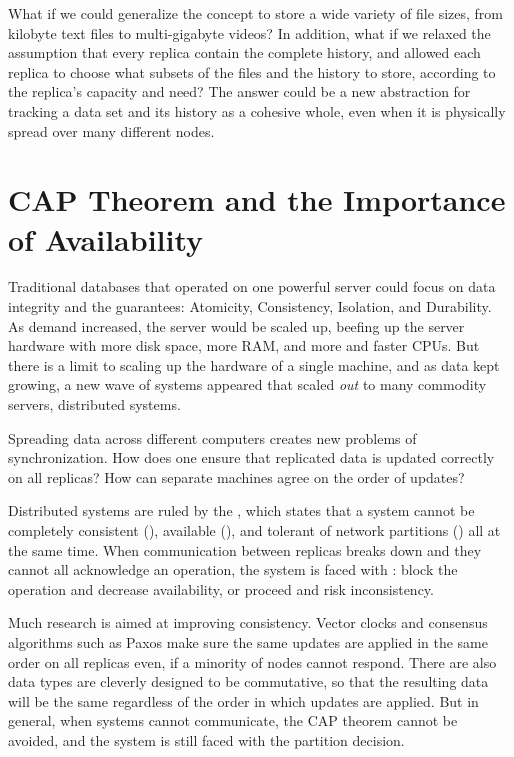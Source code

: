What if we could generalize the 
concept to store a wide variety of file sizes, from kilobyte text files to
multi-gigabyte videos? In addition, what if we relaxed the assumption that every
replica contain the complete history, and allowed each replica to choose what
subsets of the files and the history to store, according to the replica's
capacity and need? The answer could be a new abstraction for tracking a data set
and its history as a cohesive whole, even when it is physically spread over many
different nodes.

%



\section{CAP Theorem and the Importance of Availability}

Traditional databases that operated on one powerful server could focus on data
integrity and the  guarantees: Atomicity, Consistency, Isolation,
and Durability. As demand increased, the
server would be scaled up, beefing up the server hardware with more disk space,
more RAM, and more and faster CPUs. But there is a limit to scaling up the
hardware of a single machine, and as data kept growing, a new wave of systems
appeared that scaled \emph{out} to many commodity servers, distributed systems.

Spreading data across different computers creates new problems of
synchronization. How does one ensure that replicated data is updated correctly
on all replicas? How can separate machines agree on the order of updates?

Distributed systems are ruled by the  \cite{cap_origin},
which states that a system cannot be completely consistent (),
available (), and tolerant of network partitions () all at
the same time. When communication between replicas breaks down and they cannot
all acknowledge an operation, the system is faced with : block the operation and decrease availability, or proceed and risk
inconsistency\cite{cap_years_later}.

Much research is aimed at improving consistency. Vector
clocks\cite{lamport_ordering} and consensus algorithms such as
Paxos\cite{paxos_made_simple,paxos_made_moderately_complex} make sure the same
updates are applied in the same order on all replicas even, if a minority of
nodes cannot respond. There are also data types are cleverly designed to be
commutative, so that the resulting data will be the same regardless of the order
in which updates are applied\cite{crdt_orig}. But in general, when systems
cannot communicate, the CAP theorem cannot be avoided\cite{cap_proof}, and the
system is still faced with the partition decision.

